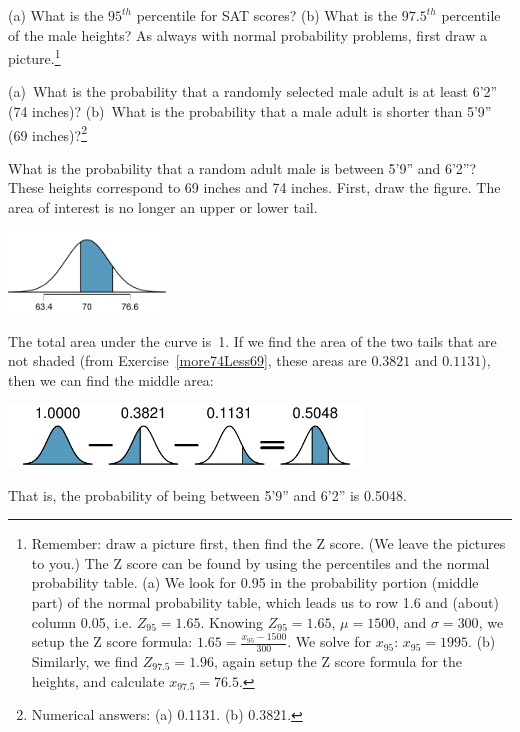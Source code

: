 \begin{exercise}
(a) What is the $95^{th}$ percentile for SAT scores? (b) What is the $97.5^{th}$ percentile of the male heights? As always with normal probability problems, first draw a picture.\footnote{Remember: draw a picture first, then find the Z score. (We leave the pictures to you.) The Z score can be found by using the percentiles and the normal probability table. (a) We look for 0.95 in the probability portion (middle part) of the normal probability table, which leads us to row 1.6 and (about) column 0.05, i.e. $Z_{95}=1.65$. Knowing $Z_{95}=1.65$, $\mu = 1500$, and $\sigma = 300$, we setup the Z score formula: $1.65 = \frac{x_{95} - 1500}{300}$. We solve for $x_{95}$: $x_{95} = 1995$. (b) Similarly, we find $Z_{97.5} = 1.96$, again setup the Z score formula for the heights, and calculate $x_{97.5} = 76.5$.}
\end{exercise}

\begin{exercise}\label{more74Less69}
(a)~What is the probability that a randomly selected male adult is at least 6'2'' (74 inches)? (b)~What is the probability that a male adult is shorter than 5'9'' (69 inches)?\footnote{Numerical answers: (a) 0.1131. (b) 0.3821.}
\end{exercise}

\begin{example}{What is the probability that a random adult male is between 5'9'' and 6'2''?}
These heights correspond to 69 inches and 74 inches. First, draw the figure. The area of interest is no longer an upper or lower tail.
\begin{center}
\includegraphics[height=0.85in]{02/figures/between59And62/between59And62}
\end{center}
The total area under the curve is~1. If we find the area of the two tails that are not shaded (from Exercise~\ref{more74Less69}, these areas are $0.3821$ and $0.1131$), then we can find the middle area:
\begin{center}
\includegraphics[height=0.65in]{02/figures/subtracting2Areas/subtracting2Areas}
\end{center}
That is, the probability of being between 5'9'' and 6'2'' is 0.5048.
\end{example}


